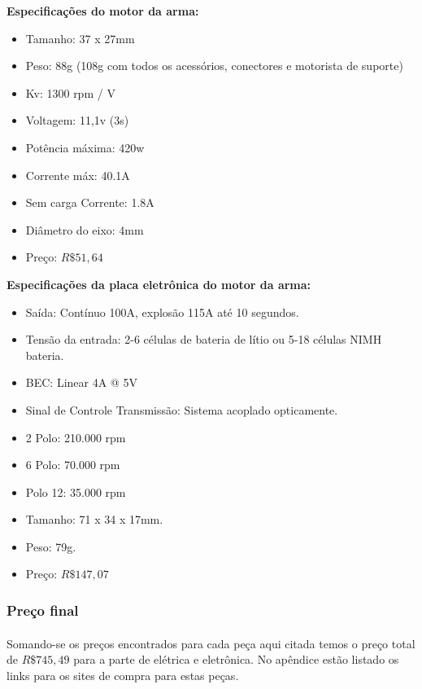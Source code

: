 \documentclass{article}
\begin{document}
                \textbf{Especificações do motor da arma:}
                \begin{itemize}
                    \item Tamanho: 37 x 27mm
                    \item Peso: 88g (108g com todos os acessórios, conectores e motorista de suporte)
                    \item Kv: 1300 rpm / V
                    \item Voltagem: 11,1v (3s)
                    \item Potência máxima: 420w
                    \item Corrente máx: 40.1A
                    \item Sem carga Corrente: 1.8A
                    \item Diâmetro do eixo: 4mm
                    \item Preço: $R\$ 51,64$
                \end{itemize}

                \textbf{Especificações da placa eletrônica do motor da arma:}
                \begin{itemize}
                    \item Saída: Contínuo 100A, explosão 115A até 10 segundos.
                    \item Tensão da entrada: 2-6 células de bateria de lítio ou 5-18 células NIMH bateria.
                    \item BEC: Linear 4A @ 5V
                    \item Sinal de Controle Transmissão: Sistema acoplado opticamente.
                    \item 2 Polo: 210.000 rpm
                    \item 6 Polo: 70.000 rpm
                    \item Polo 12: 35.000 rpm
                    \item Tamanho: 71 x 34 x 17mm.
                    \item Peso: 79g.
                    \item Preço: $R\$ 147,07$
                \end{itemize}

            \subsubsection{Preço final}
                \paragraph{}
                Somando-se os preços encontrados para cada peça aqui citada temos o preço total de $R\$ 745,49$ para a parte de elétrica e eletrônica. No apêndice estão listado os links para os sites de compra para estas peças.
\end{document}
